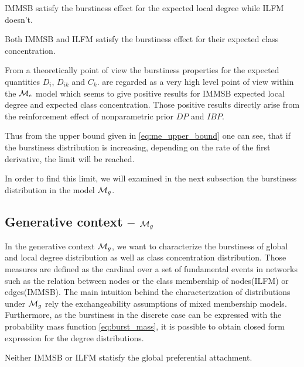 \begin{proposition}\label{th:ldegree_exp_me}
    IMMSB satisfy the burstiness effect for the  expected local degree while ILFM doesn't.
\end{proposition}

\begin{proposition}\label{th:feature_exp_me}
    Both IMMSB and ILFM satisfy the burstiness effect for their expected class concentration.
\end{proposition}


From a theoretically point of view the burstiness properties for the expected quantities $D_i$, $D_{ik}$ and $C_k$. are regarded as a very high level point of view within the $\mathcal{M}_e$ model which seems to give positive results for IMMSB expected local degree and expected class concentration. Those positive results directly arise from the reinforcement effect of nonparametric prior $DP$ and $IBP$.


Thus from the upper bound given in \eqref{eq:me_upper_bound} one can see, that if the burstiness distribution is increasing,  depending on the rate of the first derivative, the limit will be reached.

In order to find this limit, we will examined in the next subsection the burstiness distribution in the model $\mathcal{M}_g$.

\subsection{Generative context -- $\mathcal{M}_g$}

In the generative context $\mathcal{M}_g$, we want to characterize the burstiness of global and local degree distribution as well as class concentration distribution. Those measures are defined as the cardinal over a set of fundamental events in networks such as the relation between nodes or the class membership of nodes(ILFM) or edges(IMMSB). The main intuition behind the characterization of distributions under $\mathcal{M}_g$ rely the exchangeability assumptions of mixed membership models. Furthermore, as the burstiness in the discrete case can be expressed with the probability mass function \ref{eq:burst_mass}, it is possible to obtain closed form expression for the degree distributions.~\\


\begin{proposition}\label{th:gdegree_mg}
    Neither IMMSB or ILFM statisfy the global preferential attachment.
\end{proposition}

